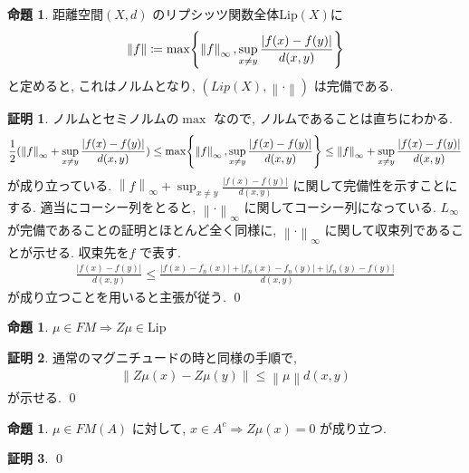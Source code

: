 \documentclass[10pt, fleqn, label-section=none]{bxjsarticle}
\theoremstyle{definition}
\newtheorem{prop}[dfn]{命題}
\newtheorem*{pf*}{証明}
\newcommand{\cbra}[1]{\mleft\{#1\mright\}}
\newcommand{\abs}[1]{\left|#1\right|}
\newcommand{\norm}[1]{\left\|#1\right\|}
\newcommand{\naraba}{\Rightarrow}
\newcommand{\Lip}{\textrm{Lip}}
\renewcommand{\;}{\, ; \,}
\begin{document}
\begin{prop}距離空間$(X, d)$ のリプシッツ関数全体$\Lip(X)$に
\begin{align*} \norm f \coloneqq \max \cbra{ \norm{f}_\infty     , \sup_{x \neq y} \frac{\abs{f(x) - f(y)}}{d(x, y)}  }  \end{align*}
と定めると, これはノルムとなり, $(Lip(X), \norm \cdot)$ は完備である. 
\end{prop}
\begin{pf*}ノルムとセミノルムの$\max$ なので, ノルムであることは直ちにわかる. 
\begin{align*} \frac{1}{2}( \norm{f}_\infty  +   \sup_{x \neq y} \frac{\abs{f(x) - f(y)}}{d(x, y)} )  \leq \max \cbra{ \norm{f}_\infty, \sup_{x \neq y} \frac{\abs{f(x) - f(y)}}{d(x, y)}  } \leq  \norm{f}_\infty  +   \sup_{x \neq y} \frac{\abs{f(x) - f(y)}}{d(x, y)}    \end{align*}
が成り立っている. $\norm{f}_\infty  +   \sup_{x \neq y} \frac{\abs{f(x) - f(y)}}{d(x, y)} $ に関して完備性を示すことにする. 適当にコーシー列をとると, $\norm \cdot _\infty$ に関してコーシー列になっている. $L_\infty$ が完備であることの証明とほとんど全く同様に, $\norm \cdot _\infty $ に関して収束列であることが示せる. 収束先を$f$ で表す. 
\begin{align*} \frac{\abs{f(x) - f(y)}}{d(x, y)} \leq \frac{\abs{f(x) - f_n(x)} + \abs{f_n(x) - f_n(y)} + \abs{f_n(y) - f (y)} }{d(x, y)}                              \end{align*}
が成り立つことを用いると主張が従う. 
\qed
\end{pf*}

\begin{prop}$\mu \in FM \naraba Z\mu  \in \Lip$

\end{prop}
\begin{pf*}
通常のマグニチュードの時と同様の手順で, 
\begin{align*} \norm{Z\mu (x) - Z \mu (y)} \leq \norm{\mu} d(x, y) \end{align*}
が示せる. 
\qed
\end{pf*}

\begin{prop}$\mu \in FM(A)$ に対して, $x \in A^c \naraba Z\mu (x) = 0 $ が成り立つ. 
\end{prop}
\begin{pf*}

\qed
\end{pf*}
\end{document}
